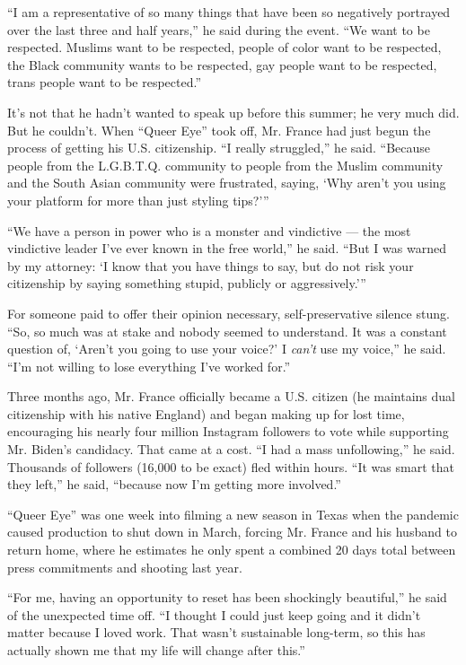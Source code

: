 ``I am a representative of so many things that have been so negatively
portrayed over the last three and half years,'' he said during the
event. ``We want to be respected. Muslims want to be respected, people
of color want to be respected, the Black community wants to be
respected, gay people want to be respected, trans people want to be
respected.''

It's not that he hadn't wanted to speak up before this summer; he very
much did. But he couldn't. When ``Queer Eye'' took off, Mr. France had
just begun the process of getting his U.S. citizenship. ``I really
struggled,'' he said. ``Because people from the L.G.B.T.Q. community to
people from the Muslim community and the South Asian community were
frustrated, saying, `Why aren't you using your platform for more than
just styling tips?'''

``We have a person in power who is a monster and vindictive --- the most
vindictive leader I've ever known in the free world,'' he said. ``But I
was warned by my attorney: `I know that you have things to say, but do
not risk your citizenship by saying something stupid, publicly or
aggressively.'''

For someone paid to offer their opinion necessary, self-preservative
silence stung. ``So, so much was at stake and nobody seemed to
understand. It was a constant question of, `Aren't you going to use your
voice?' I \emph{can't} use my voice,'' he said. ``I'm not willing to
lose everything I've worked for.''

Three months ago, Mr. France officially became a U.S. citizen (he
maintains dual citizenship with his native England) and began making up
for lost time, encouraging his nearly four million Instagram followers
to vote while supporting Mr. Biden's candidacy. That came at a cost. ``I
had a mass unfollowing,'' he said. Thousands of followers (16,000 to be
exact) fled within hours. ``It was smart that they left,'' he said,
``because now I'm getting more involved.''

``Queer Eye'' was one week into filming a new season in Texas when the
pandemic caused production to shut down in March, forcing Mr. France and
his husband to return home, where he estimates he only spent a combined
20 days total between press commitments and shooting last year.

``For me, having an opportunity to reset has been shockingly
beautiful,'' he said of the unexpected time off. ``I thought I could
just keep going and it didn't matter because I loved work. That wasn't
sustainable long-term, so this has actually shown me that my life will
change after this.''


